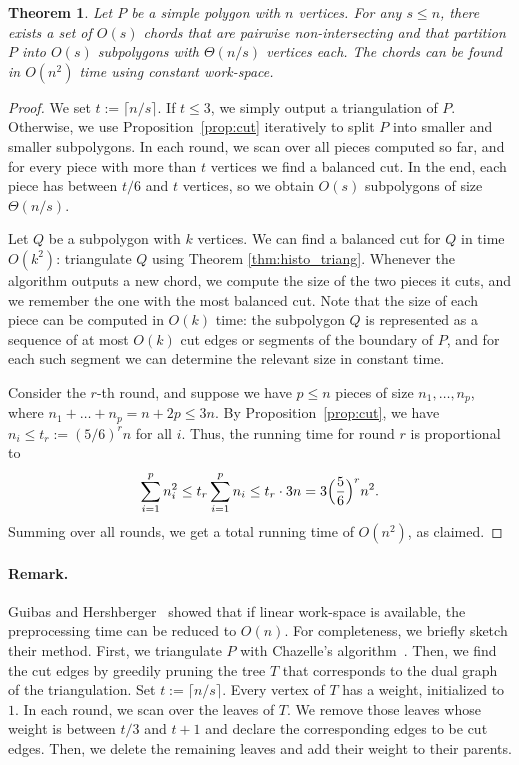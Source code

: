 \documentclass[11pt,a4paper]{article}
\newtheorem{theorem}{Theorem}[section]
\begin{document}
\begin{theorem}\label{thm:preprocess}
Let $P$ be a simple polygon with $n$ vertices. For any $s\leq n$,
there exists a set of $O(s)$ chords that are pairwise non-intersecting and that
partition $P$ into $O(s)$ subpolygons with $\Theta(n/s)$ vertices each.
The chords can be found in $O(n^2)$ time using constant work-space.
\end{theorem}
\begin{proof}
We set $t := \lceil n/s \rceil$.
If $t \le 3$, we simply output a triangulation of $P$.
Otherwise, we use Proposition~\ref{prop:cut} iteratively to
split $P$ into smaller and smaller subpolygons.
In each round, we scan over all pieces computed so far,
and for every piece with more than $t$ vertices we find a balanced
cut.
In the end, each piece has between $t/6$ and $t$ vertices, so
we obtain $O(s)$ subpolygons of size $\Theta(n/s)$.

Let $Q$ be a subpolygon with $k$ vertices. We can find a balanced cut for $Q$
in time $O(k^2)$: triangulate $Q$ using Theorem \ref{thm:histo_triang}.
Whenever the algorithm outputs a new chord, we compute the size
of the two pieces it cuts, and we remember the one with
the most balanced cut. Note that the size of each piece can
be computed in $O(k)$ time: the  subpolygon $Q$ is represented as
a sequence of at most $O(k)$ cut edges or segments of the boundary of $P$,
and for each such segment we can determine the relevant size in
constant time.

Consider the $r$-th round, and  suppose we have $p\le n$ pieces of size
$n_1,\dots,n_p$, where $n_1+\dots+n_p=n+2p\le 3n$.
By Proposition~\ref{prop:cut},
we have $n_i \leq t_r := (5/6)^r n$ for all $i$.
Thus,  the running time for round $r$ is proportional to
\[
\sum _{i=1}^p n_i^2
\leq
t_r \sum _{i=1}^p n_i
\leq
t_r \cdot 3n =  3\Bigl(\frac{5}{6}\Bigr)^rn^2.
\]
Summing over all rounds, we get a total running time of $O(n^2)$, as claimed.
\end{proof}

\paragraph{Remark.}
Guibas and Hershberger~\cite{GuiHers89} showed that
if linear work-space is available, the preprocessing time can be reduced
to $O(n)$. For completeness, we briefly sketch their method.
First, we triangulate $P$ with Chazelle's
algorithm~\cite{Chazelle91}.
Then, we find the cut edges by greedily pruning the tree $T$ that
corresponds to the dual graph of the triangulation.
Set $t := \lceil n/s \rceil$.
Every vertex of $T$ has a weight, initialized to $1$.
In each round, we scan over the leaves of $T$. We remove those
leaves whose weight is between $t/3$ and $t+1$
and declare the corresponding edges to be cut edges. Then, we
delete the remaining leaves and add their weight to their parents.
\end{document}
